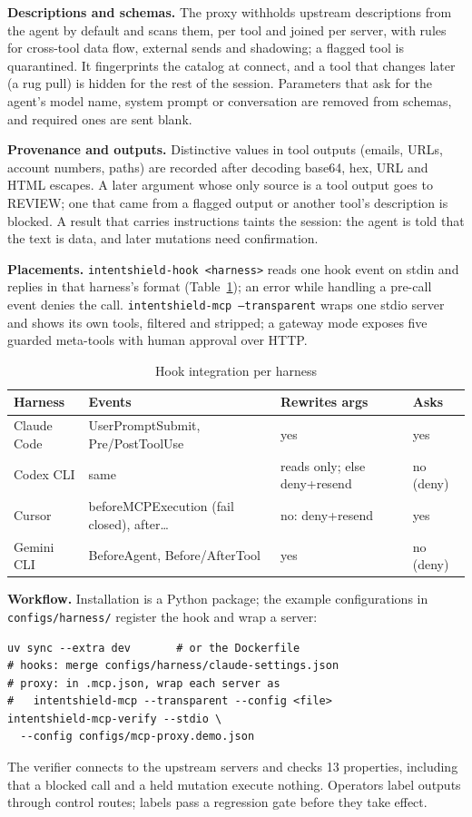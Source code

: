 \documentclass[10pt,conference]{IEEEtran}
\begin{document}
\textbf{Descriptions and schemas.} The proxy withholds upstream descriptions from the agent by
default and scans them, per tool and joined per server, with rules for cross-tool data flow,
external sends and shadowing; a flagged tool is quarantined. It fingerprints the catalog at connect,
and a tool that changes later (a rug pull) is hidden for the rest of the session. Parameters that ask
for the agent's model name, system prompt or conversation are removed from schemas, and required
ones are sent blank.

\textbf{Provenance and outputs.} Distinctive values in tool outputs (emails, URLs, account numbers,
paths) are recorded after decoding base64, hex, URL and HTML escapes. A later argument whose only
source is a tool output goes to REVIEW; one that came from a flagged output or another tool's
description is blocked. A result that carries instructions taints the session: the agent is told
that the text is data, and later mutations need confirmation.

\textbf{Placements.} \texttt{intentshield-hook <harness>} reads one hook event on stdin and replies
in that harness's format (Table~\ref{tab:harness}); an error while handling a pre-call event denies the call.
\texttt{intentshield-mcp --transparent} wraps one stdio server and shows its own tools, filtered and
stripped; a gateway mode exposes five guarded meta-tools with human approval over HTTP.

\begin{table}[t]
\caption{Hook integration per harness}
\label{tab:harness}
\centering\footnotesize
\setlength{\tabcolsep}{3pt}
\begin{tabular}{@{}lp{3.1cm}p{1.9cm}l@{}}
\toprule
Harness & Events & Rewrites args & Asks \\
\midrule
Claude Code & UserPromptSubmit, Pre/PostToolUse & yes & yes \\
Codex CLI & same & reads only; else deny+resend & no (deny) \\
Cursor & beforeMCPExecution (fail closed), after\ldots & no: deny+resend & yes \\
Gemini CLI & BeforeAgent, Before/AfterTool & yes & no (deny) \\
\bottomrule
\end{tabular}
\end{table}

\textbf{Workflow.} Installation is a Python package; the example configurations in
\texttt{configs/harness/} register the hook and wrap a server:
\begin{lstlisting}
uv sync --extra dev       # or the Dockerfile
# hooks: merge configs/harness/claude-settings.json
# proxy: in .mcp.json, wrap each server as
#   intentshield-mcp --transparent --config <file>
intentshield-mcp-verify --stdio \
  --config configs/mcp-proxy.demo.json
\end{lstlisting}
The verifier connects to the upstream servers and checks 13 properties, including that a blocked
call and a held mutation execute nothing. Operators label outputs through control routes; labels
pass a regression gate before they take effect.
\end{document}
